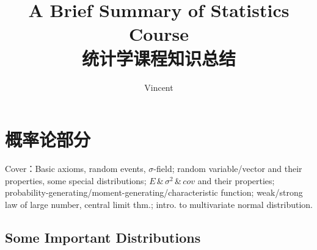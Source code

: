 \documentclass[11pt,a4paper]{ctexart}
\title{\textbf{A Brief Summary of Statistics Course}\\统计学课程知识总结}
\author{Vincent}
\numberwithin{equation}{section}%
\begin{document}
\maketitle\thispagestyle{myheadings}

\tableofcontents
\newpage





\section{概率论部分}\label{Section1Probability}
    Cover：Basic axioms, random events, $\sigma$-field; random variable/vector and their properties, some special distributions; $E$\,\&\,$\sigma^2$\,\&\,$cov$ and their properties; probability-generating/moment-generating/characteristic function; weak/strong law of large number, central limit thm.; intro. to multivariate normal distribution.



\subsection{Some Important Distributions}\label{SectionImportantDistributions}
\end{document}
